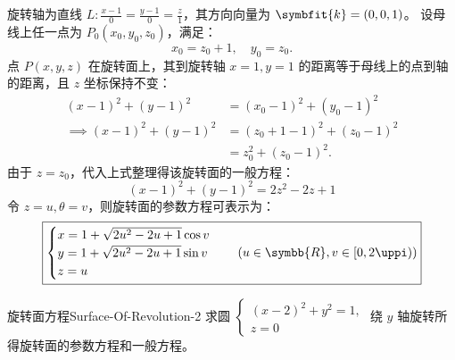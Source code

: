 \begin{solution}
    旋转轴为直线 $L: \frac{x-1}{0} = \frac{y-1}{0} = \frac{z}{1}$，其方向向量为 $\symbfit{k} = (0, 0, 1)$。
    设母线上任一点为 $P_0(x_0, y_0, z_0)$，满足：
    \begin{equation*}
        x_0 = z_0 + 1, \quad y_0 = z_0.
    \end{equation*}
    点 $P(x, y, z)$ 在旋转面上，其到旋转轴 $x=1, y=1$ 的距离等于母线上的点到轴的距离，且 $z$ 坐标保持不变：
    \begin{equation*}
        \begin{aligned}
            (x - 1)^2 + (y - 1)^2          & = (x_0 - 1)^2 + (y_0 - 1)^2     \\
            \implies (x - 1)^2 + (y - 1)^2 & = (z_0 + 1 - 1)^2 + (z_0 - 1)^2 \\
                                           & = z_0^2 + (z_0 - 1)^2.
        \end{aligned}
    \end{equation*}
    由于 $z = z_0$，代入上式整理得该旋转面的一般方程：
    \begin{equation*}
        \boxed{(x - 1)^2 + (y - 1)^2 = 2z^2 - 2z + 1}
    \end{equation*}
    令 $z = u, \theta = v$，则旋转面的参数方程可表示为：
    \begin{equation*}
        \boxed{\begin{cases}
            x = 1 + \sqrt{2u^2 - 2u + 1} \cos v \\
            y = 1 + \sqrt{2u^2 - 2u + 1} \sin v \\
            z = u
        \end{cases} \quad (u \in \symbb{R}, v \in [0, 2\uppi))}
    \end{equation*}
\end{solution}


\begin{problem}{旋转面方程}{Surface-Of-Revolution-2}
    求圆 $\begin{cases} (x - 2)^2 + y^2 = 1, \\ z = 0 \end{cases}$ 绕 $y$ 轴旋转所得旋转面的参数方程和一般方程。
\end{problem}

